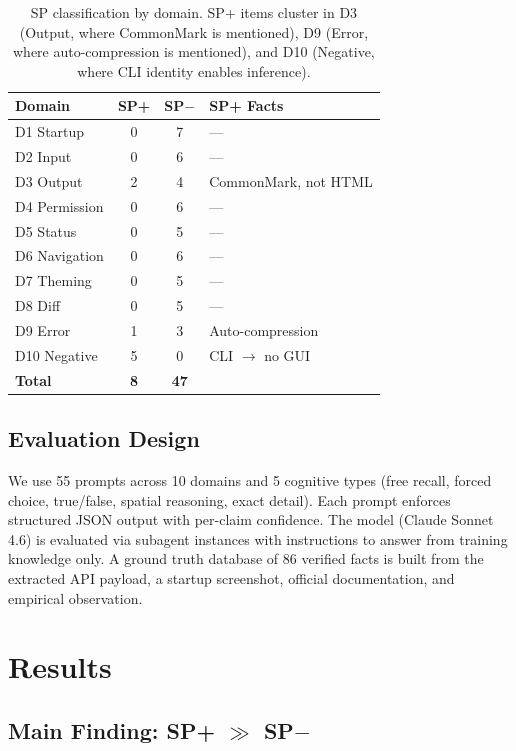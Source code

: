 \documentclass[10pt,twocolumn]{article}
\begin{document}
\begin{table}[t]
\centering
\caption{SP classification by domain. SP+ items cluster in D3 (Output, where CommonMark is mentioned), D9 (Error, where auto-compression is mentioned), and D10 (Negative, where CLI identity enables inference).}
\label{tab:sp_by_domain}
\small
\begin{tabular}{@{}lccl@{}}
\toprule
\textbf{Domain} & \textbf{SP+} & \textbf{SP$-$} & \textbf{SP+ Facts} \\
\midrule
D1 Startup    & 0 & 7 & --- \\
D2 Input      & 0 & 6 & --- \\
D3 Output     & 2 & 4 & CommonMark, not HTML \\
D4 Permission & 0 & 6 & --- \\
D5 Status     & 0 & 5 & --- \\
D6 Navigation & 0 & 6 & --- \\
D7 Theming    & 0 & 5 & --- \\
D8 Diff       & 0 & 5 & --- \\
D9 Error      & 1 & 3 & Auto-compression \\
D10 Negative  & 5 & 0 & CLI $\rightarrow$ no GUI \\
\midrule
\textbf{Total} & \textbf{8} & \textbf{47} & \\
\bottomrule
\end{tabular}
\end{table}

\subsection{Evaluation Design}

We use 55 prompts across 10 domains and 5 cognitive types (free recall, forced choice, true/false, spatial reasoning, exact detail).
Each prompt enforces structured JSON output with per-claim confidence.
The model (Claude Sonnet 4.6) is evaluated via subagent instances with instructions to answer from training knowledge only.
A ground truth database of 86 verified facts is built from the extracted API payload, a startup screenshot, official documentation, and empirical observation.

\section{Results}

\subsection{Main Finding: SP+ $\gg$ SP$-$}
\end{document}
